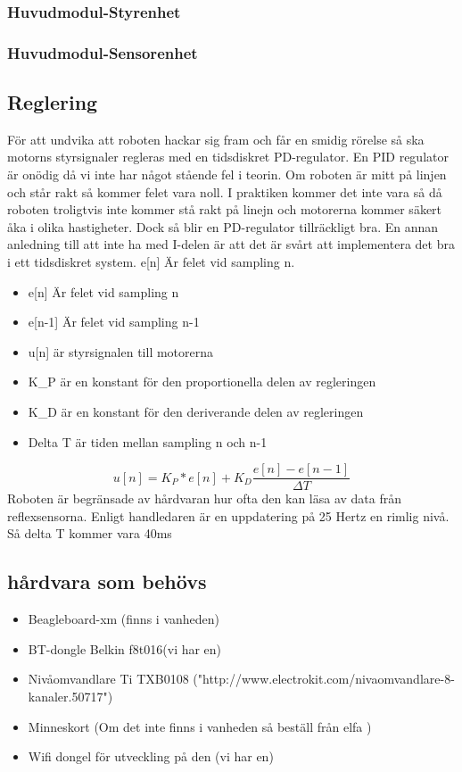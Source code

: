\subsubsection{Huvudmodul-Styrenhet}
\subsubsection{Huvudmodul-Sensorenhet}
\subsection{Reglering}
För att undvika att roboten hackar sig fram och får en smidig rörelse så ska motorns styrsignaler regleras med en tidsdiskret PD-regulator. En PID regulator är onödig då vi inte har något stående fel i teorin. Om roboten är mitt på linjen och står rakt så kommer felet vara noll. I praktiken kommer det inte vara så då roboten troligtvis inte kommer stå rakt på linejn och motorerna kommer säkert åka i olika hastigheter. Dock så blir en PD-regulator tillräckligt bra. En annan anledning till att inte ha med I-delen är att det är svårt att implementera det bra i ett tidsdiskret system. e[n] Är felet vid sampling n. 
\begin{itemize}
\item e[n] Är felet vid sampling n
\item e[n-1] Är felet vid sampling n-1
\item u[n] är styrsignalen till motorerna
\item K\_P är en konstant för den proportionella delen av regleringen
\item K\_D är en konstant för den deriverande delen av regleringen
\item Delta T är tiden mellan sampling n och n-1
 
\end{itemize}
 $$ u[n] = K_P*e[n] + K_D\frac{e[n]-e[n-1]}{\Delta T}$$
 Roboten är begränsade av hårdvaran hur ofta den kan läsa av data från reflexsensorna. Enligt handledaren är en uppdatering på 25 Hertz en rimlig nivå. Så delta T kommer vara 40ms
\subsection{hårdvara som behövs}
\begin{itemize}
\item Beagleboard-xm (finns i vanheden)
\item BT-dongle Belkin f8t016(vi har en)
\item Nivåomvandlare Ti TXB0108 ("http://www.electrokit.com/nivaomvandlare-8-kanaler.50717")
\item Minneskort (Om det inte finns i vanheden så beställ från elfa )
\item Wifi dongel för utveckling på den (vi har en)
\end{itemize}
